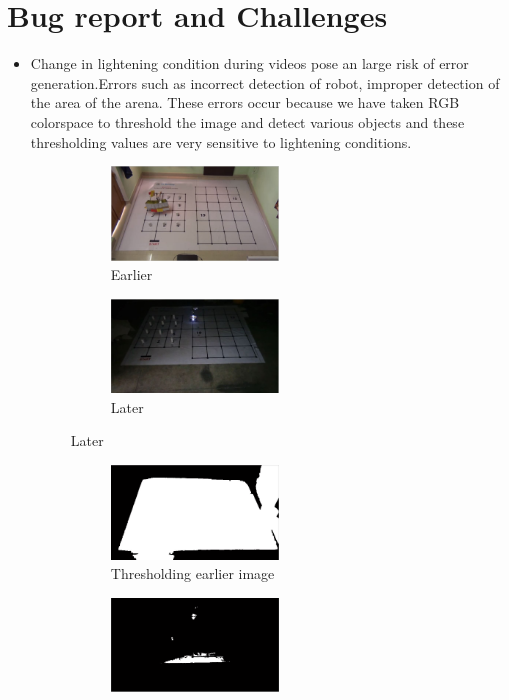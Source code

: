 \documentclass[a4paper,12pt,oneside]{book}
\begin{document}
\section{Bug report and Challenges}
\begin{itemize}
\item Change in lightening condition during videos pose an large risk of error generation.Errors such as incorrect detection of robot, improper detection of the area of the arena. These errors occur because we have taken RGB colorspace to threshold the image and detect various objects and these thresholding values are very sensitive to lightening conditions.
    \begin{figure}[h!]
		\begin{subfigure}{0.4\textwidth}
		\includegraphics[width=1\linewidth, height=2.5cm]{1.JPG}
			\caption{Earlier}
		\end{subfigure}
		\begin{subfigure}{0.4\textwidth}
			\includegraphics[width=1\linewidth, height=2.5cm]{3.JPG}
			\caption{Later}
		\end{subfigure}
	\end{figure}	
	 \begin{figure}[h!]
		\begin{subfigure}{0.4\textwidth}
			\includegraphics[width=1\linewidth, height=2.5cm]{11.JPG}
			\caption{Thresholding earlier image}
		\end{subfigure}
		\begin{subfigure}{0.4\textwidth}
			\includegraphics[width=1\linewidth, height=2.5cm]{33.JPG}

\end{subfigure}
\end{figure}
\end{itemize}
\end{document}

